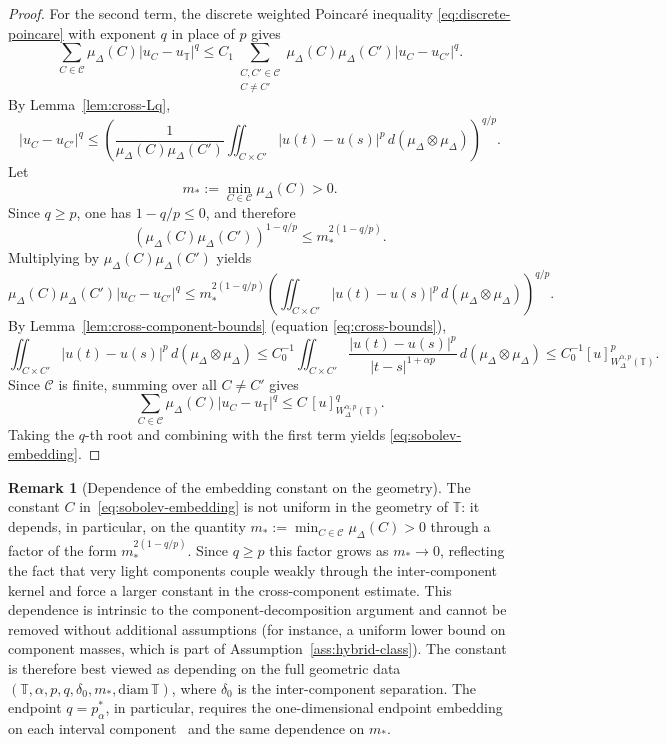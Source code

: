 \documentclass[11pt,a4paper]{article}
\numberwithin{equation}{section}
\theoremstyle{definition}
\newtheorem{remark}[remark]{Remark}
\newcommand{\T}{\mathbb{T}}
\begin{document}
\begin{proof}
For the second term, the discrete weighted Poincar\'e inequality
\eqref{eq:discrete-poincare} with exponent $q$ in place of $p$ gives
\[
\sum_{C\in\mathcal C}\mu_\Delta(C)|u_C-u_\T|^q
\le C_1\sum_{\substack{C,C'\in\mathcal C\\C\neq C'}}
\mu_\Delta(C)\mu_\Delta(C')|u_C-u_{C'}|^q.
\]
By Lemma~\ref{lem:cross-Lq},
\[
|u_C-u_{C'}|^q
\le
\left(\frac{1}{\mu_\Delta(C)\mu_\Delta(C')}
\iint_{C\times C'}|u(t)-u(s)|^p\,d(\mu_\Delta\otimes\mu_\Delta)
\right)^{q/p}.
\]
Let
\[
m_*:=\min_{C\in\mathcal C}\mu_\Delta(C)>0.
\]
Since $q\ge p$, one has $1-q/p\le 0$, and therefore
\[
(\mu_\Delta(C)\mu_\Delta(C'))^{1-q/p}\le m_*^{2(1-q/p)}.
\]
Multiplying by $\mu_\Delta(C)\mu_\Delta(C')$ yields
\[
\mu_\Delta(C)\mu_\Delta(C')|u_C-u_{C'}|^q
\le
m_*^{2(1-q/p)}
\left(\iint_{C\times C'}|u(t)-u(s)|^p\,
d(\mu_\Delta\otimes\mu_\Delta)\right)^{q/p}.
\]
By Lemma~\ref{lem:cross-component-bounds} (equation \eqref{eq:cross-bounds}),
\[
\iint_{C\times C'}|u(t)-u(s)|^p\,d(\mu_\Delta\otimes\mu_\Delta)
\le C_0^{-1}
\iint_{C\times C'}\frac{|u(t)-u(s)|^p}{|t-s|^{1+\alpha p}}\,
d(\mu_\Delta\otimes\mu_\Delta)
\le C_0^{-1}[u]^p_{W^{\alpha,p}_\Delta(\T)}.
\]
Since $\mathcal C$ is finite, summing over all $C\neq C'$ gives
\[
\sum_{C\in\mathcal C}\mu_\Delta(C)|u_C-u_\T|^q
\le C\,[u]^q_{W^{\alpha,p}_\Delta(\T)}.
\]
Taking the $q$-th root and combining with the first term yields
\eqref{eq:sobolev-embedding}.
\end{proof}

\begin{remark}[Dependence of the embedding constant on the geometry]\label{rem:embedding-constant-m-star}
The constant $C$ in~\eqref{eq:sobolev-embedding} is not uniform in
the geometry of $\T$: it depends, in particular, on the quantity
$m_* := \min_{C\in\mathcal C}\mu_\Delta(C)>0$ through a factor of the
form $m_*^{2(1-q/p)}$. Since $q\ge p$ this factor grows as $m_*\to 0$,
reflecting the fact that very light components couple weakly through
the inter-component kernel and force a larger constant in the
cross-component estimate. This dependence is intrinsic to the
component-decomposition argument and cannot be removed without
additional assumptions (for instance, a uniform lower bound on
component masses, which is part of
Assumption~\ref{ass:hybrid-class}). The constant is therefore best
viewed as depending on the full geometric data
$(\T,\alpha,p,q,\delta_0,m_*,\mathrm{diam}\,\T)$, where $\delta_0$
is the inter-component separation. The endpoint $q=p^*_\alpha$,
in particular, requires the one-dimensional endpoint embedding on
each interval component~\cite[Theorem~8.2]{DiNezzaPalatucciValdinoci2012}
and the same dependence on $m_*$.
\end{remark}
\end{document}
